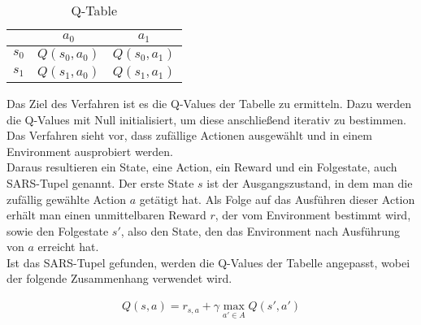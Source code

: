 \documentclass[11pt]{scrartcl}
\begin{document}
\begin{table}[h]
  \begin{center}
    \begin{tabular}{c | c | c}
       & $a_0$ & $a_1$ \\
      \hline
      $s_0$ & $Q(s_0, a_0)$ &$ Q(s_0, a_1)$ \\
      \hline
      $s_1$ & $Q(s_1, a_0)$ & $Q(s_1, a_1)$ \\
    \end{tabular}

    \caption[Q-Table]{Q-Table}
    \label{tab:q_table}
  \end{center}
\end{table}


\noindent
Das Ziel des Verfahren ist es die Q-Values der Tabelle zu ermitteln. Dazu werden die
Q-Values mit Null initialisiert, um diese anschließend iterativ zu bestimmen. Das Verfahren 
sieht vor, dass zufällige Actionen ausgewählt und in einem Environment ausprobiert werden.\\
Daraus resultieren ein State, eine Action, ein Reward und ein Folgestate, auch SARS-Tupel
genannt. Der erste State $s$ ist der Ausgangszustand, in dem man die zufällig gewählte
Action $a$ getätigt hat. Als Folge auf das Ausführen dieser Action erhält man einen
unmittelbaren Reward $r$, der vom Environment bestimmt wird, sowie den Folgestate $s'$,
also den State, den das Environment nach Ausführung von $a$ erreicht hat.\\
Ist das SARS-Tupel gefunden, werden die Q-Values der Tabelle angepasst, wobei der folgende
Zusammenhang verwendet wird.

\begin{align}
Q(s, a) = r_{s,a} + \gamma \max_{a' \in A}Q(s', a')
\label{aln:QValues}
\end{align}
\end{document}
